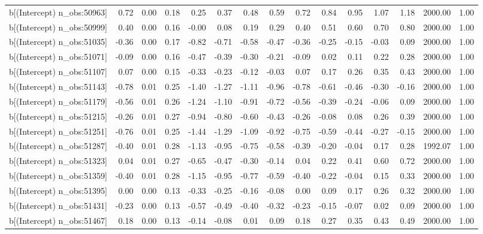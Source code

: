 \begin{table}[ht]
\begin{tabular}{rrrrrrrrrrrrrrr}
  b[(Intercept) n\_obs:50963] & 0.72 & 0.00 & 0.18 & 0.25 & 0.37 & 0.48 & 0.59 & 0.72 & 0.84 & 0.95 & 1.07 & 1.18 & 2000.00 & 1.00 \\ 
  b[(Intercept) n\_obs:50999] & 0.40 & 0.00 & 0.16 & -0.00 & 0.08 & 0.19 & 0.29 & 0.40 & 0.51 & 0.60 & 0.70 & 0.80 & 2000.00 & 1.00 \\ 
  b[(Intercept) n\_obs:51035] & -0.36 & 0.00 & 0.17 & -0.82 & -0.71 & -0.58 & -0.47 & -0.36 & -0.25 & -0.15 & -0.03 & 0.09 & 2000.00 & 1.00 \\ 
  b[(Intercept) n\_obs:51071] & -0.09 & 0.00 & 0.16 & -0.47 & -0.39 & -0.30 & -0.21 & -0.09 & 0.02 & 0.11 & 0.22 & 0.28 & 2000.00 & 1.00 \\ 
  b[(Intercept) n\_obs:51107] & 0.07 & 0.00 & 0.15 & -0.33 & -0.23 & -0.12 & -0.03 & 0.07 & 0.17 & 0.26 & 0.35 & 0.43 & 2000.00 & 1.00 \\ 
  b[(Intercept) n\_obs:51143] & -0.78 & 0.01 & 0.25 & -1.40 & -1.27 & -1.11 & -0.96 & -0.78 & -0.61 & -0.46 & -0.30 & -0.16 & 2000.00 & 1.00 \\ 
  b[(Intercept) n\_obs:51179] & -0.56 & 0.01 & 0.26 & -1.24 & -1.10 & -0.91 & -0.72 & -0.56 & -0.39 & -0.24 & -0.06 & 0.09 & 2000.00 & 1.00 \\ 
  b[(Intercept) n\_obs:51215] & -0.26 & 0.01 & 0.27 & -0.94 & -0.80 & -0.60 & -0.43 & -0.26 & -0.08 & 0.08 & 0.26 & 0.39 & 2000.00 & 1.00 \\ 
  b[(Intercept) n\_obs:51251] & -0.76 & 0.01 & 0.25 & -1.44 & -1.29 & -1.09 & -0.92 & -0.75 & -0.59 & -0.44 & -0.27 & -0.15 & 2000.00 & 1.00 \\ 
  b[(Intercept) n\_obs:51287] & -0.40 & 0.01 & 0.28 & -1.13 & -0.95 & -0.75 & -0.58 & -0.39 & -0.20 & -0.04 & 0.17 & 0.28 & 1992.07 & 1.00 \\ 
  b[(Intercept) n\_obs:51323] & 0.04 & 0.01 & 0.27 & -0.65 & -0.47 & -0.30 & -0.14 & 0.04 & 0.22 & 0.41 & 0.60 & 0.72 & 2000.00 & 1.00 \\ 
  b[(Intercept) n\_obs:51359] & -0.40 & 0.01 & 0.28 & -1.15 & -0.95 & -0.77 & -0.59 & -0.40 & -0.22 & -0.04 & 0.15 & 0.33 & 2000.00 & 1.00 \\ 
  b[(Intercept) n\_obs:51395] & 0.00 & 0.00 & 0.13 & -0.33 & -0.25 & -0.16 & -0.08 & 0.00 & 0.09 & 0.17 & 0.26 & 0.32 & 2000.00 & 1.00 \\ 
  b[(Intercept) n\_obs:51431] & -0.23 & 0.00 & 0.13 & -0.57 & -0.49 & -0.40 & -0.32 & -0.23 & -0.15 & -0.07 & 0.02 & 0.09 & 2000.00 & 1.00 \\ 
  b[(Intercept) n\_obs:51467] & 0.18 & 0.00 & 0.13 & -0.14 & -0.08 & 0.01 & 0.09 & 0.18 & 0.27 & 0.35 & 0.43 & 0.49 & 2000.00 & 1.00 \\ 

\end{tabular}
\end{table}

